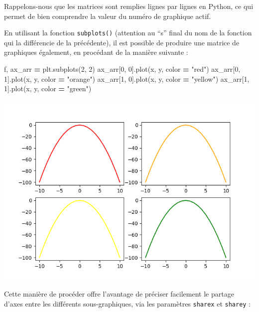 \documentclass[
  12pt,
]{book}
\newenvironment{Shaded}{\begin{snugshade}}{\end{snugshade}}
\newcommand{\DecValTok}[1]{\textcolor[rgb]{0.00,0.00,0.81}{#1}}
\newcommand{\NormalTok}[1]{#1}
\newcommand{\OperatorTok}[1]{\textcolor[rgb]{0.81,0.36,0.00}{\textbf{#1}}}
\newcommand{\StringTok}[1]{\textcolor[rgb]{0.31,0.60,0.02}{#1}}
\numberwithin{equation}{section}
\numberwithin{countremarque}{section}
\begin{document}
Rappelons-nous que les matrices sont remplies lignes par lignes en Python, ce qui permet de bien comprendre la valeur du numéro de graphique actif.

En utilisant la fonction \texttt{subplots()} (attention au ``s'' final du nom de la fonction qui la différencie de la précédente), il est possible de produire une matrice de graphiques également, en procédant de la manière suivante :

\begin{Shaded}
\begin{Highlighting}[]
\NormalTok{f, ax\_arr }\OperatorTok{=}\NormalTok{ plt.subplots(}\DecValTok{2}\NormalTok{, }\DecValTok{2}\NormalTok{)}
\NormalTok{ax\_arr[}\DecValTok{0}\NormalTok{, }\DecValTok{0}\NormalTok{].plot(x, y, color }\OperatorTok{=} \StringTok{"red"}\NormalTok{)}
\NormalTok{ax\_arr[}\DecValTok{0}\NormalTok{, }\DecValTok{1}\NormalTok{].plot(x, y, color }\OperatorTok{=} \StringTok{"orange"}\NormalTok{)}
\NormalTok{ax\_arr[}\DecValTok{1}\NormalTok{, }\DecValTok{0}\NormalTok{].plot(x, y, color }\OperatorTok{=} \StringTok{"yellow"}\NormalTok{)}
\NormalTok{ax\_arr[}\DecValTok{1}\NormalTok{, }\DecValTok{1}\NormalTok{].plot(x, y, color }\OperatorTok{=} \StringTok{"green"}\NormalTok{)}
\end{Highlighting}
\end{Shaded}

\begin{center}\includegraphics[width=9.03in]{figs/pyplot/subplots} \end{center}

Cette manière de procéder offre l'avantage de préciser facilement le partage d'axes entre les différents sous-graphiques, via les paramètres \texttt{sharex} et \texttt{sharey} :
\end{document}
